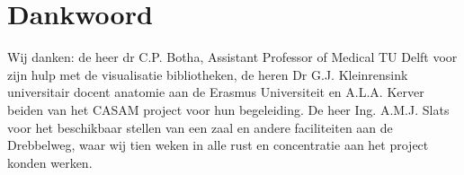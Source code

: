 \section{Dankwoord}
\label{Dankwoord}
Wij danken: de heer dr C.P. Botha, Assistant Professor of Medical TU Delft voor zijn hulp met de visualisatie bibliotheken, de heren Dr G.J. Kleinrensink universitair docent anatomie aan de Erasmus Universiteit en A.L.A. Kerver beiden van het CASAM project voor hun begeleiding. De heer Ing. A.M.J. Slats voor het beschikbaar stellen van een zaal en andere faciliteiten aan de Drebbelweg, waar wij tien weken in alle rust en concentratie aan het project konden werken.

